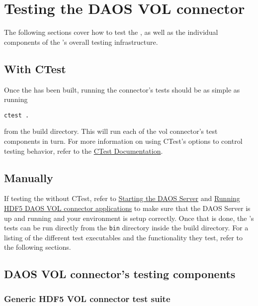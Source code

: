 \documentclass[../users_guide.tex]{subfiles}
\begin{document}
\section{Testing the DAOS VOL connector}

The following sections cover how to test the \dvc{}, as well as the individual components of the \dvc's overall testing infrastructure.

\subsection{With CTest}

Once the \dvc{} has been built, running the \gls{connector}'s tests should be as simple as running

\begin{verbatim}
ctest .
\end{verbatim}

from the build directory. This will run each of the \acrshort{vol} \gls{connector}'s test components in turn. For more information on using CTest's options to control testing behavior, refer to the \href{https://cmake.org/cmake/help/latest/manual/ctest.1.html}{CTest Documentation}.

\subsection{Manually}

If testing the \dvc{} without CTest, refer to \hyperref[sec:daos_serv_start]{Starting the DAOS Server} and \hyperref[running_daos_vol_apps]{Running HDF5 DAOS VOL connector applications} to make sure that the DAOS Server is up and running and your environment is setup correctly. Once that is done, the \dvc's tests can be run directly from the \texttt{bin} directory inside the build directory. For a listing of the different test executables and the functionality they test, refer to the following sections.


\subsection{DAOS VOL connector's testing components}

\subsubsection{Generic HDF5 VOL connector test suite}
\end{document}
